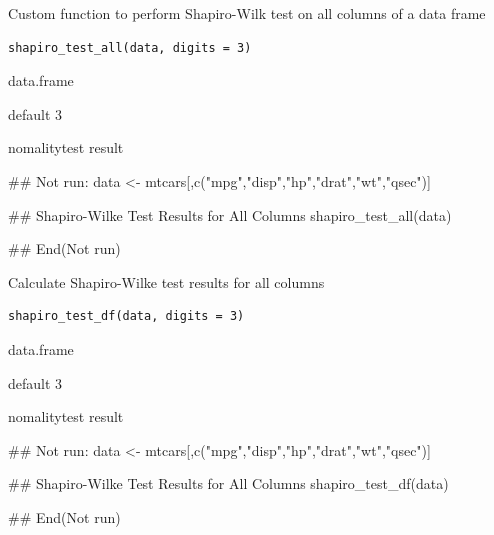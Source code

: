 \documentclass[a4paper]{book}
\begin{document}
%
\begin{Description}
Custom function to perform Shapiro-Wilk test on all columns of a data frame
\end{Description}
%
\begin{Usage}
\begin{verbatim}
shapiro_test_all(data, digits = 3)
\end{verbatim}
\end{Usage}
%
\begin{Arguments}
\begin{ldescription}
\item[\code{data}] data.frame

\item[\code{digits}] default 3
\end{ldescription}
\end{Arguments}
%
\begin{Value}
nomalitytest result
\end{Value}
%
\begin{Examples}
\begin{ExampleCode}
\#\# Not run: 
data <- mtcars[,c("mpg","disp","hp","drat","wt","qsec")]

## Shapiro-Wilke Test Results for All Columns
shapiro_test_all(data)


## End(Not run)

\end{ExampleCode}
\end{Examples}

%
\begin{Description}
Calculate Shapiro-Wilke test results for all columns
\end{Description}
%
\begin{Usage}
\begin{verbatim}
shapiro_test_df(data, digits = 3)
\end{verbatim}
\end{Usage}
%
\begin{Arguments}
\begin{ldescription}
\item[\code{data}] data.frame

\item[\code{digits}] default 3
\end{ldescription}
\end{Arguments}
%
\begin{Value}
nomalitytest result
\end{Value}
%
\begin{Examples}
\begin{ExampleCode}
\#\# Not run: 
data <- mtcars[,c("mpg","disp","hp","drat","wt","qsec")]

## Shapiro-Wilke Test Results for All Columns
shapiro_test_df(data)


## End(Not run)
\end{ExampleCode}
\end{Examples}
\end{document}
